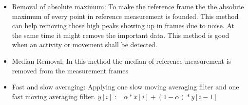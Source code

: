 \begin{itemize}
    \item{Removal of absolute maximum}:  
    To make the reference frame the the absolute maximum of every point in reference measurement is founded. This method can help removing those high peaks showing up in frames due to noise. At the same time it might remove the important data. This method is good when an activity or movement shall be detected.
    \item Median Removal: In this method the median of reference measurement is removed from the measurement frames
    \item Fast and slow averaging: Applying one slow moving averaging filter and one fast moving averaging filter. 
       $ y[i] := \alpha * x[i] + (1-\alpha) * y[i-1]$
\end{itemize}
